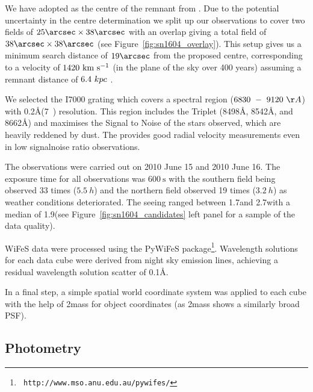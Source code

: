 \documentclass[preprint2]{aastex}
\begin{document}
We have adopted   as the centre of the remnant from \citet{2008ApJ...689..225K}. Due to the potential uncertainty in the centre determination \citep[for a more detailed discussion about the difficulty of centre determination see Section~2.2 in][]{2012ApJ...759....7K} we split up our observations to cover two fields of $25\arcsec\times38\arcsec$ with an overlap giving a total field of $38\arcsec\times38\arcsec$ (see Figure~\ref{fig:sn1604_overlay}). This setup gives us a minimum search distance of $19\arcsec$ from the proposed centre, corresponding to a velocity of $1420~\textrm{km}~\textrm{s}^{-1}$ (in the plane of the sky over 400 years) assuming a remnant distance of $6.4~kpc$ \citep{2012A&A...537A.139C}. 



We selected the I7000 grating which covers a spectral region  ($6830~-~9120~\AA$) with 0.2\AA (7~\kms) resolution. This region includes the  Triplet (8498\AA, 8542\AA, and 8662\AA) and maximises the Signal to Noise of the stars observed, which are heavily reddened by dust. The  provides good radial velocity measurements even in low \gls{signalnoise} ratio observations.

The observations were carried out  on 2010 June 15 and 2010 June 16. The exposure time for all observations was $600~\textrm{s}$ with the southern field being observed 33 times ($5.5~h$) and the northern field observed 19 times ($3.2~h$) as weather conditions deteriorated. 
The seeing ranged between 1.7\arcsec and 2.7\arcsec with a median of 1.9\arcsec (see Figure~\ref{fig:sn1604_candidates} left panel for a sample of the data quality). 




WiFeS data were processed using the PyWiFeS package\footnote[1]{{\tt
http://www.mso.anu.edu.au/pywifes/}}.  Wavelength solutions for each
data cube were derived from night sky emission lines, achieving a
residual wavelength solution scatter of 0.1\AA.


In a final step, a simple spatial world coordinate system was applied to each cube with the help of \gls{2mass} for object coordinates (as \gls{2mass} shows a similarly broad PSF).



\subsection{Photometry}
\end{document}

